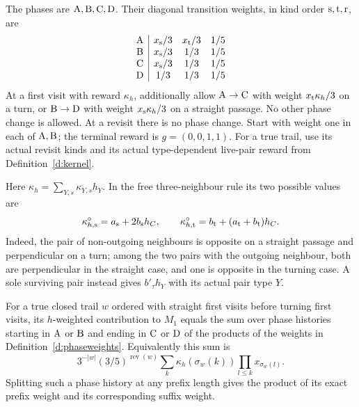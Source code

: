 \begin{definition}\label{d:phaseweights}
The phases are \({\rm A},{\rm B},{\rm C},{\rm D}\). Their
diagonal transition weights, in kind order \({\rm s},{\rm t},{\rm r}\), are
\[
 \begin{array}{c|ccc}
 {\rm A}&x_{\rm s}/3&x_{\rm t}/3&1/5\\
 {\rm B}&x_{\rm s}/3&1/3&1/5\\
 {\rm C}&x_{\rm s}/3&1/3&1/5\\
 {\rm D}&1/3&1/3&1/5
 \end{array}
\]
At a first visit with reward \(\kappa_h\), additionally allow
\({\rm A}\to{\rm C}\) with weight \(x_{\rm t}\kappa_h/3\) on a turn,
or \({\rm B}\to{\rm D}\) with weight \(x_{\rm s}\kappa_h/3\)
on a straight passage. No other phase change is allowed.
At a revisit there is no phase change.
Start with weight one in each of \({\rm A},{\rm B}\);
the terminal reward is \(g=(0,0,1,1)\).
For a true trail, use its actual revisit kinds and its actual
type-dependent live-pair reward from Definition~\ref{d:kernel}.
\end{definition}

Here \(\kappa_h=\sum_{Y,s}\kappa_{Y,s}h_Y\). In the free
three-neighbour rule its two possible values are
\[
 \kappa_{h,\rm s}^{\circ}=a_{\rm s}+2b_{\rm s}h_C,
 \qquad
 \kappa_{h,\rm t}^{\circ}=b_{\rm t}+(a_{\rm t}+b_{\rm t})h_C.
\]
Indeed, the pair of non-outgoing neighbours is opposite on a
straight passage and perpendicular on a turn; among the two pairs
with the outgoing neighbour, both are perpendicular in the straight
case, and one is opposite in the turning case. A sole surviving
pair instead gives \(b'_\tau h_Y\) with its actual pair type \(Y\).

\begin{lemma}\label{l:phase-expansion}
For a true closed trail \(w\) ordered with straight first visits
before turning first visits, its \(h\)-weighted contribution to
\(M_1\) equals the sum over phase histories starting in
\({\rm A}\) or \({\rm B}\) and ending in \({\rm C}\) or \({\rm D}\)
of the products of the weights in Definition~\ref{d:phaseweights}.
Equivalently this sum is
\[
 3^{-|w|}(3/5)^{\operatorname{rev}(w)}
       \sum_k\kappa_h(\sigma_w(k))\prod_{l\le k}x_{\sigma_w(l)}.
\]
Splitting such a phase history at any prefix length gives the
product of its exact prefix weight and its corresponding suffix weight.
\end{lemma}

